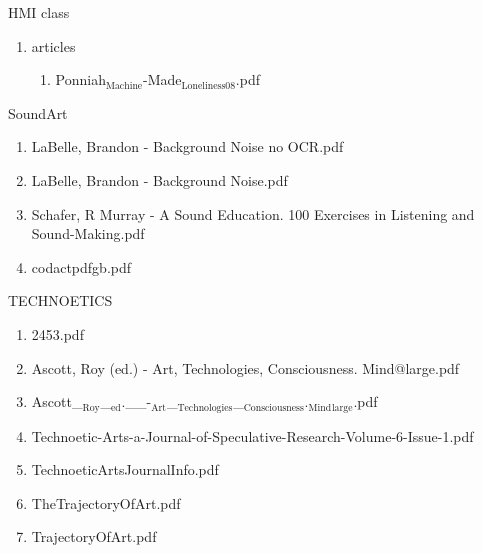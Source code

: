 \documentclass[11pt]{article}
\begin{document}
\item HMI class
\label{sec-1-1-1-1-11-10}
\begin{enumerate}
\item articles
\label{sec-1-1-1-1-11-10-1}
\begin{enumerate}
\item Ponniah$_{\text{Machine}}$-Made$_{\text{Loneliness08}}$.pdf
\label{sec-1-1-1-1-11-10-1-1}
\end{enumerate}
\end{enumerate}

\item SoundArt
\label{sec-1-1-1-1-11-11}
\begin{enumerate}
\item LaBelle, Brandon - Background Noise no OCR.pdf
\label{sec-1-1-1-1-11-11-1}

\item LaBelle, Brandon - Background Noise.pdf
\label{sec-1-1-1-1-11-11-2}

\item Schafer, R Murray - A Sound Education. 100 Exercises in Listening and Sound-Making.pdf
\label{sec-1-1-1-1-11-11-3}

\item codactpdfgb.pdf
\label{sec-1-1-1-1-11-11-4}
\end{enumerate}

\item TECHNOETICS
\label{sec-1-1-1-1-11-12}
\begin{enumerate}
\item 2453.pdf
\label{sec-1-1-1-1-11-12-1}

\item Ascott, Roy (ed.) - Art, Technologies, Consciousness. Mind@large.pdf
\label{sec-1-1-1-1-11-12-2}

\item Ascott\_$_{\text{Roy}}$\_$_{\text{ed}}$.\_\_-$_{\text{Art}}$\_$_{\text{Technologies}}$\_$_{\text{Consciousness}}$.$_{\text{Mind}}$$_{\text{large}}$.pdf
\label{sec-1-1-1-1-11-12-3}

\item Technoetic-Arts-a-Journal-of-Speculative-Research-Volume-6-Issue-1.pdf
\label{sec-1-1-1-1-11-12-4}

\item TechnoeticArtsJournalInfo.pdf
\label{sec-1-1-1-1-11-12-5}

\item TheTrajectoryOfArt.pdf
\label{sec-1-1-1-1-11-12-6}

\item TrajectoryOfArt.pdf
\label{sec-1-1-1-1-11-12-7}
\end{enumerate}
\end{document}
